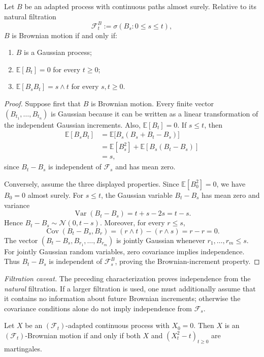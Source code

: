 \begin{proposition}
Let $B$ be an adapted process with continuous paths almost surely. Relative
to its natural filtration
\[
 \mathcal{F}_t^B:=\sigma(B_s:0\le s\le t),
\]
$B$ is Brownian motion if and only if:
\begin{enumerate}
 \item $B$ is a Gaussian process;
 \item $\mathbb{E}[B_t]=0$ for every $t\ge0$;
 \item $\mathbb{E}[B_sB_t]=s\wedge t$ for every $s,t\ge0$.
\end{enumerate}
\end{proposition}
\begin{proof}
Suppose first that $B$ is Brownian motion. Every finite vector
$(B_{t_1},\ldots,B_{t_n})$ is Gaussian because it can be written as a linear
transformation of the independent Gaussian increments. Also,
$\mathbb{E}[B_t]=0$. If $s\le t$, then
\begin{align*}
 \mathbb{E}[B_sB_t]
 &=\mathbb{E}\bigl[B_s(B_s+B_t-B_s)\bigr]\\
 &=\mathbb{E}[B_s^2]+\mathbb{E}[B_s(B_t-B_s)]\\
 &=s,
\end{align*}
since $B_t-B_s$ is independent of $\mathcal{F}_s$ and has mean zero.

Conversely, assume the three displayed properties. Since
$\mathbb{E}[B_0^2]=0$, we have $B_0=0$ almost surely. For $s\le t$,
the Gaussian variable $B_t-B_s$ has mean zero and variance
\[
 \operatorname{Var}(B_t-B_s)=t+s-2s=t-s.
\]
Hence $B_t-B_s\sim\mathcal{N}(0,t-s)$. Moreover, for every
$r\le s$,
\[
 \operatorname{Cov}(B_t-B_s,B_r)=(r\wedge t)-(r\wedge s)=r-r=0.
\]
The vector $(B_t-B_s,B_{r_1},\ldots,B_{r_m})$ is jointly Gaussian whenever
$r_1,\ldots,r_m\le s$. For jointly Gaussian random variables, zero
covariance implies independence. Thus $B_t-B_s$ is independent of
$\mathcal{F}_s^B$, proving the Brownian-increment property.
\end{proof}

\noindent\textit{Filtration caveat.} The preceding characterization proves
independence from the \emph{natural} filtration. If a larger filtration is
used, one must additionally assume that it contains no information about
future Brownian increments; otherwise the covariance conditions alone do not
imply independence from $\mathcal{F}_s$.

\begin{theorem}
Let $X$ be an $(\mathcal{F}_t)$-adapted continuous process with $X_0=0$.
Then $X$ is an $(\mathcal{F}_t)$-Brownian motion if and only if both $X$ and
$(X_t^2-t)_{t\ge0}$ are martingales.
\end{theorem}

